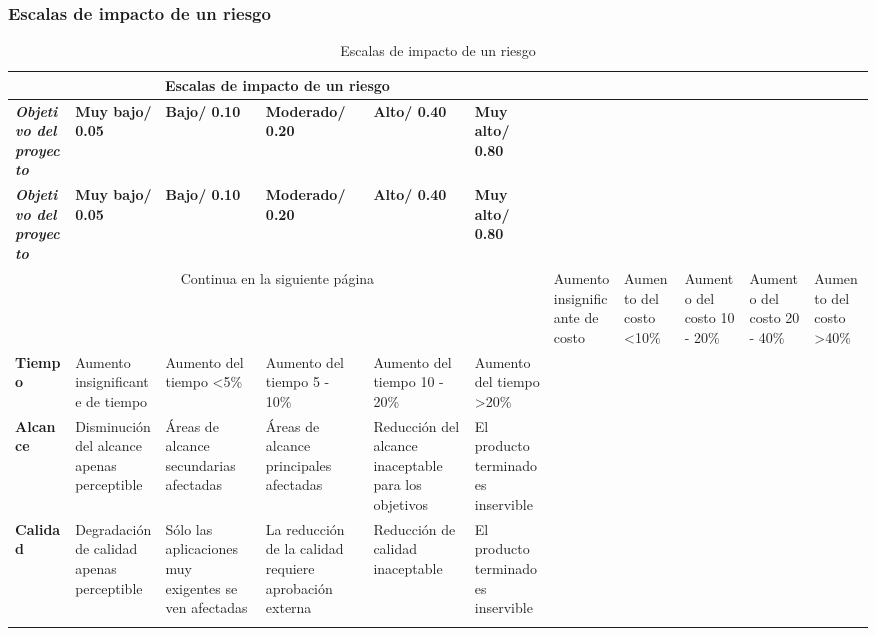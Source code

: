 \subsubsection{Escalas de impacto de un riesgo}
\begin{longtable}{| p{2.5cm} |  p{2.5cm} |  p{2.5cm} |  p{2.5cm} |  p{2.5cm} |  p{2.7cm} |}

\hline
\multicolumn{6}{|c|}{\textbf{Escalas de impacto de un riesgo}} \\ \hline
\textit{\textbf{Objetivo del proyecto}} &  \textbf{Muy bajo/ 0.05} & \textbf{Bajo/ 0.10} & \textbf{Moderado/ 0.20} & \textbf{Alto/ 0.40} & \textbf{Muy alto/ 0.80}\\
\hline \hline
\endfirsthead

\hline
\textit{\textbf{Objetivo del proyecto}} &  \textbf{Muy bajo/ 0.05} & \textbf{Bajo/ 0.10} & \textbf{Moderado/ 0.20} & \textbf{Alto/ 0.40} & \textbf{Muy alto/ 0.80}\\
\hline \hline
\endhead

\multicolumn{6}{|c|}{Continua en la siguiente página}
\endfoot

\endlastfoot


\textbf{Costo} & Aumento insignificante de costo & Aumento del costo <10\% &  Aumento del costo 10 - 20\% & Aumento del costo 20 - 40\% & Aumento del costo >40\%  \\ \hline
\textbf{Tiempo} & Aumento insignificante de tiempo & Aumento del tiempo <5\% &  Aumento del tiempo 5 - 10\% & Aumento del tiempo 10 - 20\% & Aumento del tiempo >20\%  \\ \hline
\textbf{Alcance} & Disminución del alcance apenas perceptible & Áreas de alcance secundarias afectadas & Áreas de alcance principales afectadas & Reducción del alcance inaceptable para los objetivos &  El producto terminado es inservible\\ \hline
\textbf{Calidad} & Degradación de calidad apenas perceptible & Sólo las aplicaciones muy exigentes se ven afectadas & La reducción de la calidad requiere aprobación externa & Reducción de calidad inaceptable &  El producto terminado es inservible\\ \hline


\caption{Escalas de impacto de un riesgo}
\label{Riesgos}
\end{longtable}

